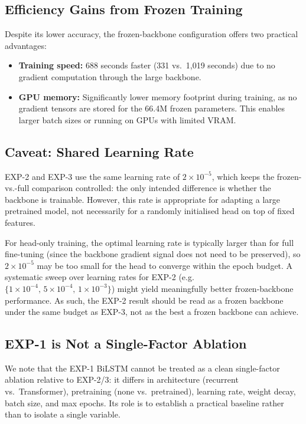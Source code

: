 \subsection{Efficiency Gains from Frozen Training}

Despite its lower accuracy, the frozen-backbone configuration offers two practical advantages:
\begin{itemize}
    \item \textbf{Training speed:} 688 seconds faster (331 vs.\ 1,019 seconds) due to no gradient computation through the large backbone.
    \item \textbf{GPU memory:} Significantly lower memory footprint during training, as no gradient tensors are stored for the 66.4M frozen parameters. This enables larger batch sizes or running on GPUs with limited VRAM.
\end{itemize}

\subsection{Caveat: Shared Learning Rate}

EXP-2 and EXP-3 use the same learning rate of $2\times10^{-5}$, which keeps the frozen-vs.-full comparison controlled: the only intended difference is whether the backbone is trainable. However, this rate is appropriate for adapting a large pretrained model, not necessarily for a randomly initialised head on top of fixed features.

For head-only training, the optimal learning rate is typically larger than for full fine-tuning (since the backbone gradient signal does not need to be preserved), so $2\times10^{-5}$ may be too small for the head to converge within the epoch budget. A systematic sweep over learning rates for EXP-2 (e.g.\ $\{1\times10^{-4},\,5\times10^{-4},\,1\times10^{-3}\}$) might yield meaningfully better frozen-backbone performance. As such, the EXP-2 result should be read as a frozen backbone under the same budget as EXP-3, not as the best a frozen backbone can achieve.

\subsection{EXP-1 is Not a Single-Factor Ablation}

We note that the EXP-1 BiLSTM cannot be treated as a clean single-factor ablation relative to EXP-2/3: it differs in architecture (recurrent vs.\ Transformer), pretraining (none vs.\ pretrained), learning rate, weight decay, batch size, and max epochs. Its role is to establish a practical baseline rather than to isolate a single variable.
